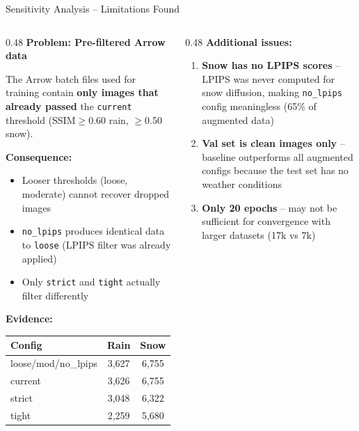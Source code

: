 \documentclass[aspectratio=169, 10pt]{beamer}
\begin{document}
\begin{frame}{Sensitivity Analysis -- Limitations Found}
\begin{columns}[T]
\begin{column}{0.48\textwidth}
\textbf{\textcolor{warnred}{Problem: Pre-filtered Arrow data}}

The Arrow batch files used for training contain \textbf{only images that already passed} the \texttt{current} threshold (SSIM$\geq$0.60 rain, $\geq$0.50 snow).

\vspace{0.3em}
\textbf{Consequence:}
\begin{itemize}
    \item Looser thresholds (loose, moderate) cannot recover dropped images
    \item \texttt{no\_lpips} produces identical data to \texttt{loose} (LPIPS filter was already applied)
    \item Only \texttt{strict} and \texttt{tight} actually filter differently
\end{itemize}

\vspace{0.3em}
\textbf{Evidence:}
{\scriptsize
\begin{tabular}{lcc}
\toprule
\textbf{Config} & \textbf{Rain} & \textbf{Snow} \\
\midrule
loose/mod/no\_lpips & 3,627 & 6,755 \\
current & 3,626 & 6,755 \\
strict & 3,048 & 6,322 \\
tight & 2,259 & 5,680 \\
\bottomrule
\end{tabular}
}
\end{column}
\begin{column}{0.48\textwidth}
\textbf{\textcolor{warnred}{Additional issues:}}

\begin{enumerate}
    \item \textbf{Snow has no LPIPS scores} -- LPIPS was never computed for snow diffusion, making \texttt{no\_lpips} config meaningless (65\% of augmented data)

    \item \textbf{Val set is clean images only} -- baseline outperforms all augmented configs because the test set has no weather conditions

    \item \textbf{Only 20 epochs} -- may not be sufficient for convergence with larger datasets (17k vs 7k)
\end{enumerate}


\end{column}
\end{columns}
\end{frame}
\end{document}
